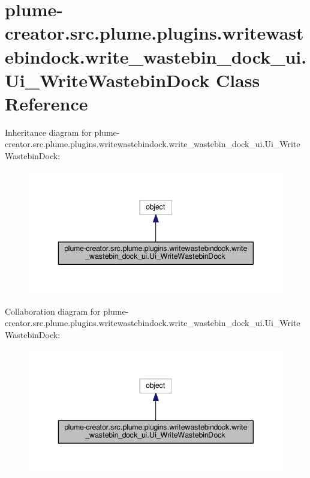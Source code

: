 \hypertarget{classplume-creator_1_1src_1_1plume_1_1plugins_1_1writewastebindock_1_1write__wastebin__dock__ui_1_1_ui___write_wastebin_dock}{}\section{plume-\/creator.src.\+plume.\+plugins.\+writewastebindock.\+write\+\_\+wastebin\+\_\+dock\+\_\+ui.\+Ui\+\_\+\+Write\+Wastebin\+Dock Class Reference}
\label{classplume-creator_1_1src_1_1plume_1_1plugins_1_1writewastebindock_1_1write__wastebin__dock__ui_1_1_ui___write_wastebin_dock}


Inheritance diagram for plume-\/creator.src.\+plume.\+plugins.\+writewastebindock.\+write\+\_\+wastebin\+\_\+dock\+\_\+ui.\+Ui\+\_\+\+Write\+Wastebin\+Dock\+:\nopagebreak
\begin{figure}[H]
\begin{center}
\leavevmode
\includegraphics[width=343pt]{classplume-creator_1_1src_1_1plume_1_1plugins_1_1writewastebindock_1_1write__wastebin__dock__ui_42dfb0fb42d28e425c32bcff3cef0c58}
\end{center}
\end{figure}


Collaboration diagram for plume-\/creator.src.\+plume.\+plugins.\+writewastebindock.\+write\+\_\+wastebin\+\_\+dock\+\_\+ui.\+Ui\+\_\+\+Write\+Wastebin\+Dock\+:\nopagebreak
\begin{figure}[H]
\begin{center}
\leavevmode
\includegraphics[width=343pt]{classplume-creator_1_1src_1_1plume_1_1plugins_1_1writewastebindock_1_1write__wastebin__dock__ui_f4a00a64df188d19e3320ba915ba4a11}
\end{center}
\end{figure}

